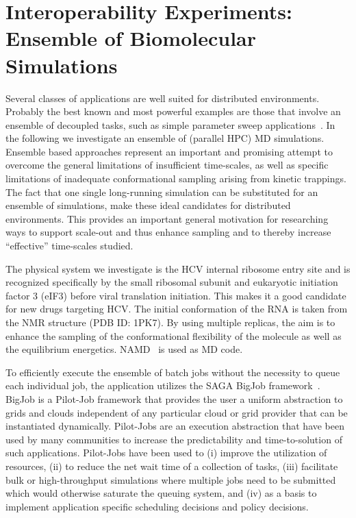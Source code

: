 \documentclass[graybox]{svmult}
\begin{document}
\section{Interoperability Experiments: Ensemble of Biomolecular
  Simulations}

Several classes of applications are well suited for distributed
environments. Probably the best known and most powerful examples are
those that involve an ensemble of decoupled tasks, such as simple
parameter sweep applications~\cite{1239909}. In the following
we investigate an ensemble of (parallel HPC) MD simulations. 
Ensemble based approaches represent an important and promising attempt
to overcome the general limitations of insufficient time-scales, as
well as specific limitations of inadequate conformational sampling
arising from kinetic trappings.  The fact that one single long-running
simulation can be substituted for an ensemble of simulations, make
these ideal candidates for distributed environments.  This 
provides an important general motivation for researching ways to
support scale-out and thus enhance sampling and to thereby increase
``effective'' time-scales studied.

The physical system we investigate is the HCV internal ribosome entry 
site and is recognized specifically by the small ribosomal subunit and 
eukaryotic initiation factor 3 (eIF3) before viral translation initiation.  
This makes it a good candidate for new drugs targeting HCV. 
The initial conformation of the RNA is taken from the NMR
structure (PDB ID: 1PK7).  By using multiple replicas, the aim is to
enhance the sampling of the conformational flexibility of the molecule
as well as the equilibrium energetics. NAMD~\cite{Phillips:2005gd} is
used as MD code.

To efficiently execute the ensemble of batch jobs without the necessity to queue 
each individual job, the application utilizes the SAGA BigJob 
framework~\cite{saga_bigjob_condor_cloud}. BigJob is a  
Pilot-Job framework that provides the user a uniform abstraction to grids and clouds
independent of any particular cloud or grid provider that can be
instantiated dynamically. Pilot-Jobs are an execution abstraction that have 
been used by many communities to increase the predictability and time-to-solution of
such applications.  Pilot-Jobs have been used to (i) improve the
utilization of resources, (ii) to reduce the net wait time of a
collection of tasks, (iii) facilitate bulk or high-throughput
simulations where multiple jobs need to be submitted which would
otherwise saturate the queuing system, and (iv) as a basis to
implement application specific scheduling decisions and policy
decisions.
\end{document}
